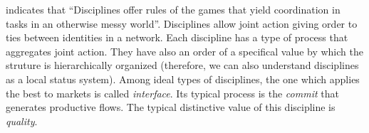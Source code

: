 \documentclass[a4paper, 12pt, openright, oneside, german, french, brazil, english]{abntex2}
\begin{document}
	 indicates that ``Disciplines offer rules of the games that yield coordination in tasks in an otherwise messy world''. Disciplines allow joint action giving order to ties between identities in a network. Each discipline has a type of process that aggregates joint action. They have also an order of a specifical value by which the struture is hierarchically organized (therefore, we can also understand disciplines as a local status system). Among ideal types of disciplines, the one which applies the best to markets is called \textit{interface}. Its typical process is the \textit{commit} that generates productive flows. The typical distinctive value of this discipline is \textit{quality}.
	
	
	
	
	
\end{document}
